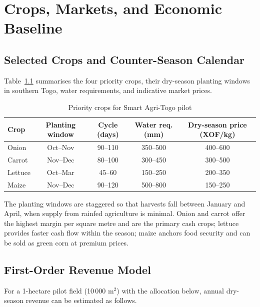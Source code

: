 \documentclass[12pt, a4paper]{report}
\begin{document}
\chapter{Crops, Markets, and Economic Baseline}

\section{Selected Crops and Counter-Season Calendar}

Table~\ref{tab:crops} summarises the four priority crops, their dry-season planting windows in southern Togo, water requirements, and indicative market prices.

\begin{table}[H]
\centering
\caption{Priority crops for Smart Agri-Togo pilot}
\label{tab:crops}
\renewcommand{\arraystretch}{1.4}
\begin{tabular}{lcccc}
\toprule
\textbf{Crop} & \textbf{Planting window} & \textbf{Cycle (days)} &
\textbf{Water req. (mm)} & \textbf{Dry-season price (XOF/kg)} \\
\midrule
Onion & Oct–Nov & 90–110 & 350–500 & 400–600 \\
Carrot & Nov–Dec & 80–100 & 300–450 & 300–500 \\
Lettuce & Oct–Mar & 45–60  & 150–250 & 200–350 \\
Maize  & Nov–Dec & 90–120 & 500–800 & 150–250 \\
\bottomrule
\end{tabular}
\end{table}

The planting windows are staggered so that harvests fall between January and April, when supply from rainfed agriculture is minimal. Onion and carrot offer the highest margin per square metre and are the primary cash crops; lettuce provides faster cash flow within the season; maize anchors food security and can be sold as green corn at premium prices.

\section{First-Order Revenue Model}

For a 1-hectare pilot field (10\,000 m$^{2}$) with the allocation below, annual dry-season revenue can be estimated as follows.
\end{document}
